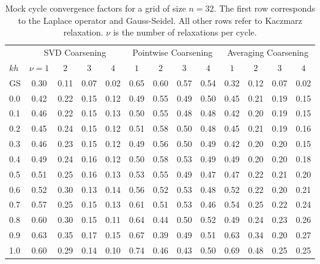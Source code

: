 \documentclass{article}
\begin{document}
\begin{table}
{\small
\begin{tabular}{l|cccc|cccc|cccc}
\toprule
& \multicolumn{4}{c|}{SVD Coarsening} & \multicolumn{4}{|c|}{Pointwise Coarsening} & \multicolumn{4}{|c}{Averaging Coarsening} \\
$kh$ &  $\nu=1$ &  $2$ &  $3$ &  $4$ &  $1$ &  $2$ &  $3$ &  $4$ &  $1$ &  $2$ &  $3$ &  $4$ \\
\midrule
GS &       0.30 &       0.11 &       0.07 &       0.02 &      0.65 &      0.60 &      0.57 &      0.54 &       0.32 &       0.12 &       0.07 &       0.02 \\
0.0   &       0.42 &       0.22 &       0.15 &       0.12 &      0.49 &      0.55 &      0.49 &      0.50 &       0.45 &       0.21 &       0.19 &       0.15 \\
0.1   &       0.46 &       0.22 &       0.15 &       0.13 &      0.50 &      0.55 &      0.48 &      0.48 &       0.42 &       0.20 &       0.19 &       0.15 \\
0.2   &       0.45 &       0.24 &       0.15 &       0.12 &      0.51 &      0.58 &      0.50 &      0.48 &       0.45 &       0.21 &       0.19 &       0.16 \\
0.3   &       0.46 &       0.23 &       0.15 &       0.12 &      0.49 &      0.56 &      0.50 &      0.49 &       0.42 &       0.20 &       0.20 &       0.15 \\
0.4   &       0.49 &       0.24 &       0.16 &       0.12 &      0.50 &      0.58 &      0.53 &      0.49 &       0.49 &       0.20 &       0.20 &       0.18 \\
0.5   &       0.51 &       0.25 &       0.16 &       0.13 &      0.53 &      0.55 &      0.49 &      0.47 &       0.47 &       0.22 &       0.21 &       0.20 \\
0.6   &       0.52 &       0.30 &       0.13 &       0.14 &      0.56 &      0.52 &      0.53 &      0.48 &       0.52 &       0.22 &       0.20 &       0.21 \\
0.7   &       0.57 &       0.25 &       0.15 &       0.13 &      0.61 &      0.51 &      0.53 &      0.46 &       0.54 &       0.25 &       0.22 &       0.24 \\
0.8   &       0.60 &       0.30 &       0.15 &       0.11 &      0.64 &      0.44 &      0.50 &      0.52 &       0.49 &       0.24 &       0.23 &       0.26 \\
0.9   &       0.63 &       0.35 &       0.17 &       0.15 &      0.67 &      0.39 &      0.49 &      0.51 &       0.63 &       0.34 &       0.20 &       0.27 \\
1.0   &       0.60 &       0.29 &       0.14 &       0.10 &      0.74 &      0.46 &      0.43 &      0.50 &       0.69 &       0.48 &       0.25 &       0.25 \\
\bottomrule
\end{tabular}
}
\caption{Mock cycle convergence factors for a grid of size $n=32$. The first row corresponds to the Laplace operator and Gauss-Seidel. All other rows refer to Kaczmarz relaxation. $\nu$ is the number of relaxations per cycle.}
\end{table}
\end{document}
